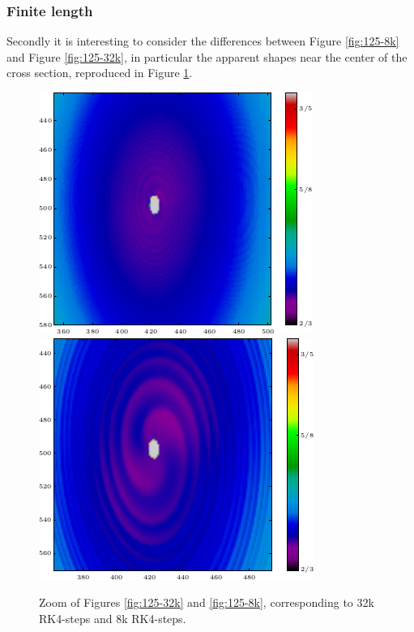 \documentclass[a4paper]{article}
\begin{document}
\subsubsection{Finite length}
Secondly it is interesting to consider the differences between Figure \ref{fig:125-8k} and Figure \ref{fig:125-32k}, in particular the apparent shapes near the center of the cross section, reproduced in Figure \ref{fig:artefacts}.
\begin{figure}[!ht]
	\centering
{}
  \includegraphics[width=\linewidth]{Figures/artefact32k.png}
\endminipage ~
  \includegraphics[width=\linewidth]{Figures/artefact8k.png}
\endminipage\hfill
	\caption{Zoom of Figures \ref{fig:125-32k} and \ref{fig:125-8k}, corresponding to 32k RK4-steps and 8k RK4-steps.}\label{fig:artefacts}
\end{figure}
\end{document}
